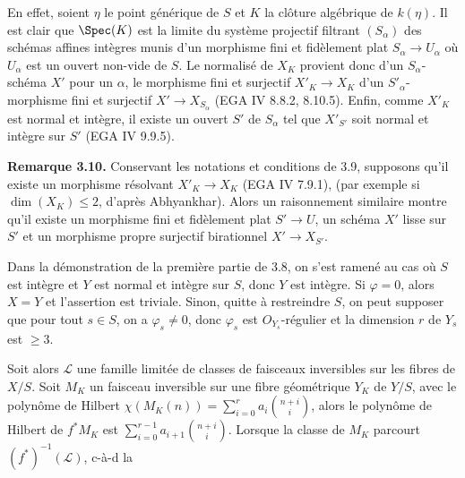 
En
effet, soient \(\eta\) le point g\'en\'erique de \(S\) et \(K\) la cl\^oture alg\'ebrique de \(k(\eta)\). Il est clair que \(\Spec(K)\) est la limite du syst\`eme projectif filtrant \((S_\alpha)\) des sch\'emas affines int\`egres munis d'un morphisme fini et fid\`element plat \(S_\alpha\to U_\alpha\) o\`u \(U_\alpha\) est un ouvert non-vide de \(S\). Le normalis\'e de \(X_K\) provient donc d'un \(S_\alpha\)-sch\'ema \(X'\) pour un \(\alpha\), le morphisme fini et surjectif \(X'_K\to X_K\) d'un \(S'_\alpha\)-morphisme fini et surjectif \(X'\to X_{S_\alpha}\) (EGA IV 8.8.2, 8.10.5). Enfin, comme \(X'_K\) est normal et int\`egre, il existe un ouvert \(S'\) de \(S_\alpha\) tel que \(X'_{S'}\) soit normal et int\`egre sur \(S'\) (EGA IV 9.9.5).

\textbf{Remarque 3.10.} Conservant les notations et conditions de 3.9, supposons qu'il existe un morphisme r\'esolvant \(X'_K\to X_K\) (EGA IV 7.9.1), (par exemple si \(\dim(X_K)\le2\), d'apr\`es Abhyankhar). Alors un raisonnement similaire montre qu'il existe un morphisme fini et fid\`element plat \(S'\to U\), un sch\'ema \(X'\) lisse sur \(S'\) et un morphisme propre surjectif birationnel \(X'\to X_{S'}\).

Dans la d\'emonstration de la premi\`ere partie de 3.8, on s'est ramen\'e au cas o\`u \(S\) est int\`egre et \(Y\) est normal et int\`egre sur \(S\), donc \(Y\) est int\`egre. Si \(\varphi=0\), alors \(X=Y\) et l'assertion est triviale. Sinon, quitte \`a restreindre \(S\), on peut supposer que pour tout \(s\in S\), on a \(\varphi_s\ne0\), donc \(\varphi_s\) est \({O}_{Y_s}\)-r\'egulier et la dimension \(r\) de \(Y_s\) est \(\ge3\).

Soit alors \(\mathcal L\) une famille limit\'ee de classes de faisceaux inversibles sur les fibres de \(X/S\). Soit \(M_K\) un faisceau inversible sur une fibre g\'eom\'etrique \(Y_K\) de \(Y/S\), avec le polyn\^ome de Hilbert \(\chi(M_K(n))=\sum_{i=0}^{r}a_i\binom{n+i}{i}\), alors le polyn\^ome de Hilbert de \(f^*M_K\) est \(\sum_{i=0}^{r-1}a_{i+1}\binom{n+i}{i}\). Lorsque la classe de \(M_K\) parcourt \((f^*)^{-1}(\mathcal L)\), c-\`a-d la
